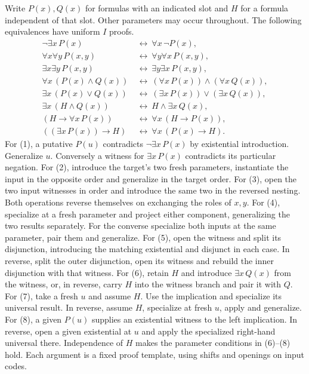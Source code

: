 Write $P(x),Q(x)$ for formulas with an indicated slot and $H$ for a
formula independent of that slot. Other parameters may occur throughout.
The following equivalences have uniform $I$ proofs.
\begin{align*}
 \neg\exists x\,P(x)&\ \leftrightarrow\ \forall x\,\neg P(x),\tag{1}\\
 \forall x\forall y\,P(x,y)&\ \leftrightarrow\ \forall y\forall x\,P(x,y),\tag{2}\\
 \exists x\exists y\,P(x,y)&\ \leftrightarrow\ \exists y\exists x\,P(x,y),\tag{3}\\
 \forall x\,(P(x)\wedge Q(x))&\ \leftrightarrow\
      (\forall x\,P(x))\wedge(\forall x\,Q(x)),\tag{4}\\
 \exists x\,(P(x)\vee Q(x))&\ \leftrightarrow\
      (\exists x\,P(x))\vee(\exists x\,Q(x)),\tag{5}\\
 \exists x\,(H\wedge Q(x))&\ \leftrightarrow\ H\wedge\exists x\,Q(x),\tag{6}\\
 (H\to\forall x\,P(x))&\ \leftrightarrow\ \forall x\,(H\to P(x)),\tag{7}\\
 ((\exists x\,P(x))\to H)&\ \leftrightarrow\ \forall x\,(P(x)\to H).\tag{8}
\end{align*}
For (1), a putative $P(u)$ contradicts $\neg\exists x\,P(x)$ by
existential introduction. Generalize $u$. Conversely a witness for
$\exists x\,P(x)$ contradicts its particular negation. For (2), introduce
the target's two fresh parameters, instantiate the input in the opposite
order and generalize in the target order. For (3), open the two input
witnesses in order and introduce the same two in the reversed nesting.
Both operations reverse themselves on exchanging the roles of $x,y$.
For (4), specialize at a fresh parameter and project either component,
generalizing the two results separately. For the converse specialize
both inputs at the same parameter, pair them and generalize. For (5),
open the witness and split its disjunction, introducing the matching
existential and disjunct in each case. In reverse, split the outer
disjunction, open its witness and rebuild the inner disjunction
with that witness. For (6), retain $H$ and introduce $\exists x\,Q(x)$
from the witness, or, in reverse, carry $H$ into the witness branch
and pair it with $Q$. For (7), take a fresh $u$ and assume $H$.
Use the implication and specialize its universal result. In reverse,
assume $H$, specialize at fresh $u$, apply and generalize.
For (8), a given $P(u)$ supplies an existential witness to the left
implication. In reverse, open a given existential at $u$ and apply the
specialized right-hand universal there. Independence of $H$ makes the
parameter conditions in (6)--(8) hold. Each argument is a fixed proof
template, using shifts and openings on input codes.

